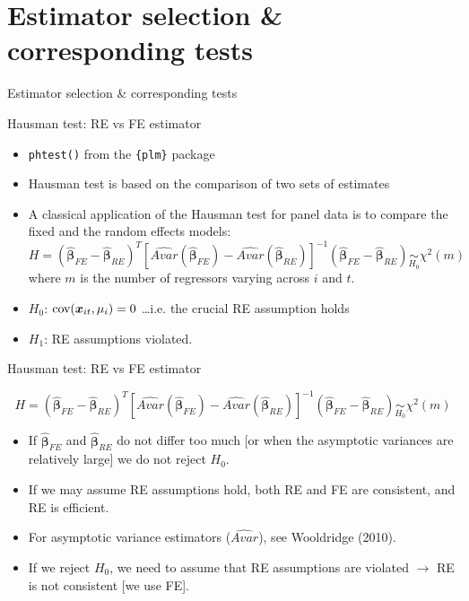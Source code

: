 \documentclass{beamer}
\begin{document}
\section{Estimator selection \& corresponding tests}
\begin{frame}{Estimator selection \& corresponding tests}
\end{frame}
\begin{frame}{Hausman test: RE vs FE estimator}
\begin{itemize}
    \item \texttt{phtest()} from the \texttt{\{plm\}} package
    \medskip
    \item Hausman test is based on the comparison of two sets of estimates
    \medskip
    \item A classical application of the Hausman test for panel data is to compare the fixed and the random effects models:
    {\small $$H=(\hat{\bm{\beta}}_{FE} - \hat{\bm{\beta}}_{RE})^T [\widehat{\textit{Avar}}(\hat{\bm{\beta}}_{FE}) - \widehat{\textit{Avar}}(\hat{\bm{\beta}}_{RE})]^{-1} (\hat{\bm{\beta}}_{FE} - \hat{\bm{\beta}}_{RE}) \underset{H_0}{\sim} \chi^2(m)$$}
    {\footnotesize where $m$ is the number of regressors varying across $i$ and $t$.}
    \smallskip
    \item[] $H_0$: $\textnormal{cov}(\bm{x}_{it},\mu_i) = 0$ \dots i.e. the crucial RE assumption holds
    \item[] $H_1$: RE assumptions violated.
\end{itemize}
\end{frame}
\begin{frame}{Hausman test: RE vs FE estimator}

{\small $$H=(\hat{\bm{\beta}}_{FE} - \hat{\bm{\beta}}_{RE})^T [\widehat{\textit{Avar}}(\hat{\bm{\beta}}_{FE}) - \widehat{\textit{Avar}}(\hat{\bm{\beta}}_{RE})]^{-1} (\hat{\bm{\beta}}_{FE} - \hat{\bm{\beta}}_{RE}) \underset{H_0}{\sim} \chi^2(m)$$}
\medskip
\begin{itemize}
    \item If $\hat{\bm{\beta}}_{FE}$ and $\hat{\bm{\beta}}_{RE}$ do not differ too much [or when the asymptotic variances are relatively large] we do not reject $H_0$. 
    \medskip
    \item If we may assume RE assumptions hold, both RE and FE are consistent, and RE is efficient. 
    \medskip
    \item For asymptotic variance estimators ($\widehat{\textit{Avar}}$), see Wooldridge (2010). 
    \medskip
    \item If we reject $H_0$, we need to assume that RE assumptions are violated $\rightarrow$ RE is not consistent [we use FE].
\end{itemize}
\end{frame}
\end{document}
